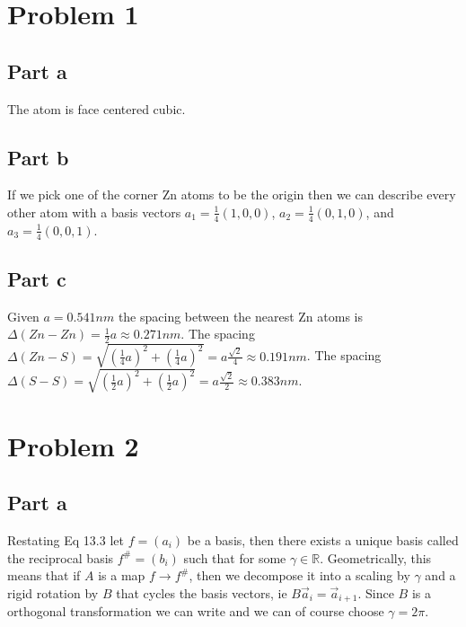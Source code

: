 \section*{Problem 1}
\subsection*{Part a}
The atom is face centered cubic.
\subsection*{Part b}
If we pick one of the corner Zn atoms to be the origin then we can describe every other atom with a basis vectors $a_1 = \frac{1}{4} (1,0,0)$, $a_2 = \frac{1}{4} (0,1,0)$, and $a_3 = \frac{1}{4} (0,0,1)$.
\subsection*{Part c}
Given $a = 0.541nm$ the spacing between the nearest Zn atoms is $\Delta (Zn-Zn) = \frac{1}{2} a \approx 0.271nm$. The spacing $\Delta (Zn-S) = \sqrt{(\frac{1}{4}a)^2+(\frac{1}{4}a)^2} = a \frac{\sqrt{2}}{4} \approx 0.191nm$. The spacing $\Delta (S-S) = \sqrt{(\frac{1}{2}a)^2 + (\frac{1}{2}a)^2} = a \frac{\sqrt{2}}{2} \approx 0.383nm$.

\pagebreak
\section*{Problem 2}
\subsection*{Part a}
Restating Eq 13.3 let $f = (a_i)$ be a basis, then there exists a unique basis called the reciprocal basis $f^\# = (b_i)$ such that
for some $\gamma \in \mathbb{R}$. Geometrically, this means that if $A$ is a map $f \rightarrow f^\#$, then we decompose it into a scaling by $\gamma$ and a rigid rotation by $B$ that cycles the basis vectors, ie $B\Vec{a}_i = \Vec{a}_{i+1}$. Since $B$ is a orthogonal transformation we can write
and we can of course choose $\gamma = 2\pi$.

